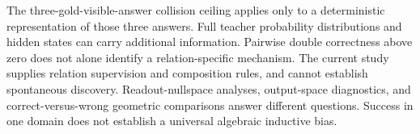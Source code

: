 \documentclass[11pt]{article}
\begin{document}
The three-gold-visible-answer collision ceiling applies only to a deterministic representation of those three answers. Full teacher probability distributions and hidden states can carry additional information. Pairwise double correctness above zero does not alone identify a relation-specific mechanism. The current study supplies relation supervision and composition rules, and cannot establish spontaneous discovery. Readout-nullspace analyses, output-space diagnostics, and correct-versus-wrong geometric comparisons answer different questions. Success in one domain does not establish a universal algebraic inductive bias.



\end{document}
